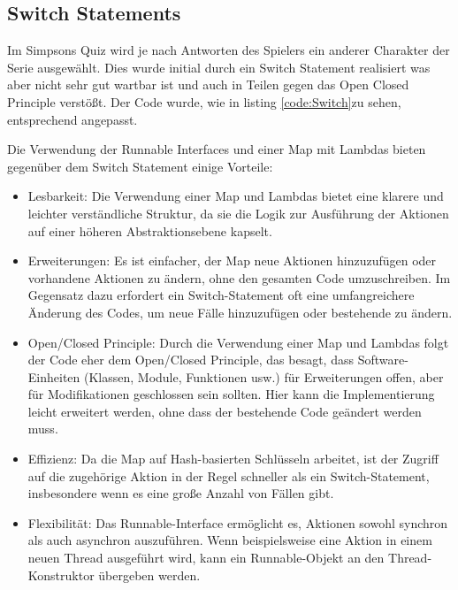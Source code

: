 \subsection{Switch Statements}
Im Simpsons Quiz wird je nach Antworten des Spielers ein anderer Charakter der Serie ausgewählt. Dies wurde initial durch ein Switch Statement realisiert was aber nicht sehr gut wartbar ist und auch in Teilen gegen das Open Closed Principle verstößt. Der Code wurde, wie in listing \ref{code:Switch}zu sehen, entsprechend angepasst.


Die Verwendung der Runnable Interfaces und einer Map mit Lambdas bieten gegenüber dem Switch Statement einige Vorteile:
\begin{itemize}
    \item Lesbarkeit: Die Verwendung einer Map und Lambdas bietet eine klarere und leichter verständliche Struktur, da sie die Logik zur Ausführung der Aktionen auf einer höheren Abstraktionsebene kapselt.
    \item Erweiterungen: Es ist einfacher, der Map neue Aktionen hinzuzufügen oder vorhandene Aktionen zu ändern, ohne den gesamten Code umzuschreiben. Im Gegensatz dazu erfordert ein Switch-Statement oft eine umfangreichere Änderung des Codes, um neue Fälle hinzuzufügen oder bestehende zu ändern.
    \item Open/Closed Principle: Durch die Verwendung einer Map und Lambdas folgt der Code eher dem Open/Closed Principle, das besagt, dass Software-Einheiten (Klassen, Module, Funktionen usw.) für Erweiterungen offen, aber für Modifikationen geschlossen sein sollten. Hier kann die Implementierung leicht erweitert werden, ohne dass der bestehende Code geändert werden muss.
    \item Effizienz: Da die Map auf Hash-basierten Schlüsseln arbeitet, ist der Zugriff auf die zugehörige Aktion in der Regel schneller als ein Switch-Statement, insbesondere wenn es eine große Anzahl von Fällen gibt.
    \item Flexibilität: Das Runnable-Interface ermöglicht es, Aktionen sowohl synchron als auch asynchron auszuführen. Wenn beispielsweise eine Aktion in einem neuen Thread ausgeführt wird, kann ein Runnable-Objekt an den Thread-Konstruktor übergeben werden.
\end{itemize}
\newpage
